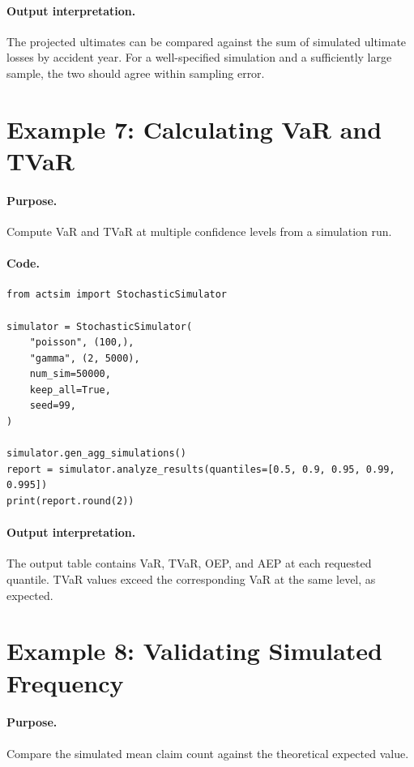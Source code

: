 \paragraph{Output interpretation.} The projected ultimates can be
compared against the sum of simulated ultimate losses by accident year.
For a well-specified simulation and a sufficiently large sample, the
two should agree within sampling error.

\section{Example 7: Calculating VaR and TVaR}

\paragraph{Purpose.} Compute VaR and TVaR at multiple confidence levels
from a simulation run.

\paragraph{Code.}
\begin{lstlisting}[style=pythonstyle]
from actsim import StochasticSimulator

simulator = StochasticSimulator(
    "poisson", (100,),
    "gamma", (2, 5000),
    num_sim=50000,
    keep_all=True,
    seed=99,
)

simulator.gen_agg_simulations()
report = simulator.analyze_results(quantiles=[0.5, 0.9, 0.95, 0.99, 0.995])
print(report.round(2))
\end{lstlisting}

\paragraph{Output interpretation.} The output table contains VaR, TVaR,
OEP, and AEP at each requested quantile. TVaR values exceed the
corresponding VaR at the same level, as expected.

\section{Example 8: Validating Simulated Frequency}

\paragraph{Purpose.} Compare the simulated mean claim count against the
theoretical expected value.

